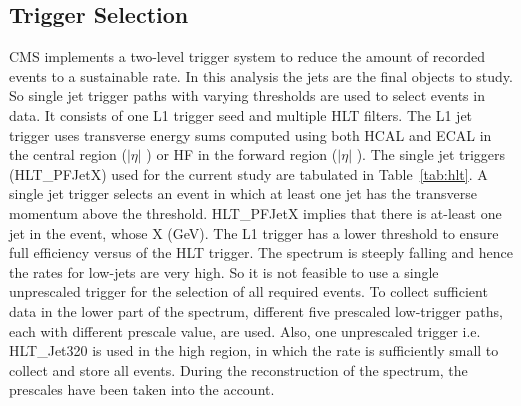 \subsection{Trigger Selection}

CMS implements a two-level trigger system to reduce the amount of recorded events to a sustainable rate. In this analysis the jets are the final objects to study. So single jet trigger paths with varying thresholds are used to select events in data. It consists of one L1 trigger seed and multiple HLT filters. The L1 jet trigger uses transverse energy sums computed using both HCAL and ECAL in the central region ($|\eta|$ ) or HF in the forward region ($|\eta|$ ). The single jet triggers (HLT\_PFJetX) used for the current study are tabulated in Table~\ref{tab:hlt}. A single jet trigger selects an event in which at least one jet has the transverse momentum above the threshold. HLT\_PFJetX implies that there is at-least one jet in the event, whose \pt \gr X (GeV). The L1 trigger has a lower threshold to ensure full efficiency versus \pt of the HLT trigger. The \pt spectrum is steeply falling and hence the rates for low-\pt jets are very high. So it is not feasible to use a single unprescaled trigger for the selection of all required events. To collect sufficient data in the lower part of the \pt spectrum, different five prescaled low-\pt trigger paths, each with different prescale value, are used. Also, one unprescaled trigger i.e. HLT\_Jet320 is used in the high \pt region, in which the rate is sufficiently small to collect and store all events. During the reconstruction of the spectrum, the prescales have been taken into the account.

